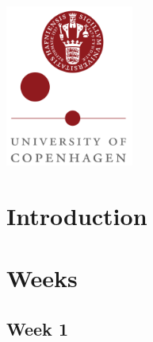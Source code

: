 \documentclass[
]{article}
\begin{document}
{\begin{titlepage}




\includegraphics[height=200px, keepaspectratio]{logo_ku.png}\\[4cm] %
 

\vfill %
\end{titlepage}
\setcounter{tocdepth}{5}
\tableofcontents
}
\thispagestyle{empty}
\newpage
\setcounter{page}{1}
\pagestyle{fancy}
\hypertarget{introduction}{%
\section{Introduction}\label{introduction}}

\hypertarget{weeks}{%
\section{Weeks}\label{weeks}}

\hypertarget{week-1}{%
\subsection{Week 1}\label{week-1}}
\end{document}

